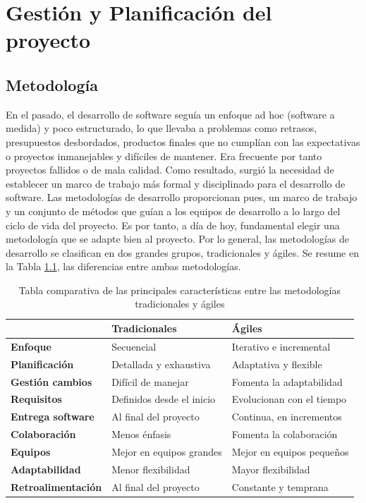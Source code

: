 \chapter{Gestión y Planificación del proyecto}

\newcommand{\footnotecomma}{$^{,}$}

\section{Metodología}

En el pasado, el desarrollo de software seguía un enfoque ad hoc (software a medida) y poco estructurado, lo que llevaba a problemas como retrasos, presupuestos desbordados, productos finales que no cumplían con las expectativas o proyectos inmanejables y difíciles de mantener. Era frecuente por tanto proyectos fallidos o de mala calidad. Como resultado, surgió la necesidad de establecer un marco de trabajo más formal y disciplinado para el desarrollo de software. Las metodologías de desarrollo proporcionan pues, un marco de trabajo y un conjunto de métodos que guían a los equipos de desarrollo a lo largo del ciclo de vida del proyecto. Es por tanto, a día de hoy, fundamental elegir una metodología que se adapte bien al proyecto.
Por lo general, las metodologías de desarrollo se clasifican en dos grandes grupos, tradicionales y ágiles. Se resume en la Tabla \ref{tabla:resumen_trad_agil}, las diferencias entre ambas metodologías. 


\begin{table}[h!]
    \centering
    \begin{tabular}[t]{lll}
        \toprule
         & \textbf{Tradicionales} & \textbf{Ágiles} \\
        \midrule
        \textbf{Enfoque} & Secuencial & Iterativo e incremental   \\
        \midrule
        \textbf{Planificación} & Detallada y exhaustiva & Adaptativa y flexible   \\
        \midrule
        \textbf{Gestión cambios} & Difícil de manejar & Fomenta la adaptabilidad   \\
        \midrule
        \textbf{Requisitos} & Definidos desde el inicio & Evolucionan con el tiempo     \\
        \midrule
       \textbf{Entrega software} & Al final del proyecto & Continua, en incrementos      \\
        \midrule
        \textbf{Colaboración} & Menos énfasis & Fomenta la colaboración      \\
        \midrule
        \textbf{Equipos} & Mejor en equipos grandes & Mejor en equipos pequeños      \\
        \midrule
        \textbf{Adaptabilidad} & Menor flexibilidad & Mayor flexibilidad      \\
        \midrule
        \textbf{Retroalimentación} & Al final del proyecto & Constante y temprana      \\
        \bottomrule
    \end{tabular}
    \caption{Tabla comparativa de las principales características entre las metodologías tradicionales y ágiles}
    \label{tabla:resumen_trad_agil}
\end{table}



